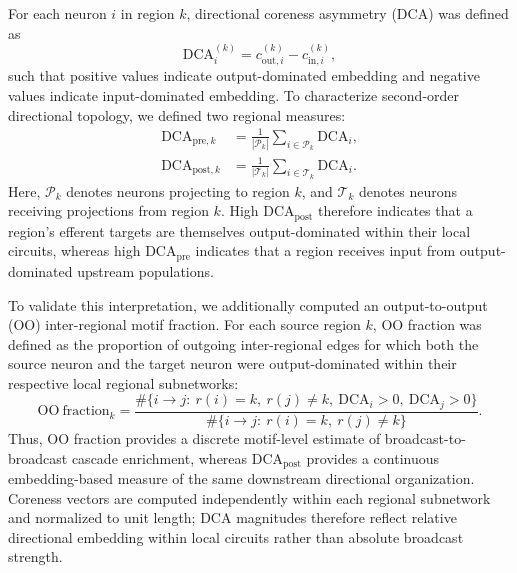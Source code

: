 \documentclass[9pt,twocolumn,twoside]{pnas-new}
\begin{document}
{For each neuron $i$ in region $k$, directional coreness asymmetry (DCA) was defined as
\[
\mathrm{DCA}_i^{(k)} = c_{\mathrm{out},i}^{(k)} - c_{\mathrm{in},i}^{(k)},
\]
such that positive values indicate output-dominated embedding and negative values indicate input-dominated embedding. To characterize second-order directional topology, we defined two regional measures:
\begin{equation}
\begin{aligned}
\mathrm{DCA}_{{\mathrm{pre}},k} &=
\frac{1}{|\mathcal{P}_k|}
\sum_{i \in \mathcal{P}_k} \mathrm{DCA}_i, \\
\mathrm{DCA}_{{\mathrm{post}},k} &=
\frac{1}{|\mathcal{T}_k|}
\sum_{i \in \mathcal{T}_k} \mathrm{DCA}_i .
\end{aligned}
\end{equation}
Here, $\mathcal{P}_k$ denotes neurons projecting to region $k$, and $\mathcal{T}_k$ denotes neurons receiving projections from region $k$. High $\mathrm{DCA}_{\mathrm{post}}$ therefore indicates that a region's efferent targets are themselves output-dominated within their local circuits, whereas high $\mathrm{DCA}_{\mathrm{pre}}$ indicates that a region receives input from output-dominated upstream populations.

To validate this interpretation, we additionally computed an output-to-output (OO) inter-regional motif fraction. For each source region $k$, OO fraction was defined as the proportion of outgoing inter-regional edges for which both the source neuron and the target neuron were output-dominated within their respective local regional subnetworks:
\[
\mathrm{OO\ fraction}_k =
\frac{
\#\{i \rightarrow j:\ r(i)=k,\ r(j)\neq k,\ \mathrm{DCA}_i>0,\ \mathrm{DCA}_j>0\}
}{
\#\{i \rightarrow j:\ r(i)=k,\ r(j)\neq k\}
}.
\]
Thus, OO fraction provides a discrete motif-level estimate of broadcast-to-broadcast cascade enrichment, whereas $\mathrm{DCA}_{\mathrm{post}}$ provides a continuous embedding-based measure of the same downstream directional organization. Coreness vectors are computed independently within each regional subnetwork and normalized to unit length; DCA magnitudes therefore reflect relative directional embedding within local circuits rather than absolute broadcast strength.




}
\end{document}
